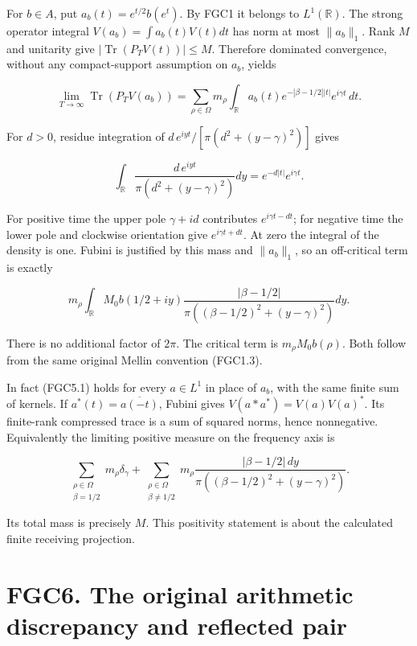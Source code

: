 For \(b\in A\), put \(a_b(t)=e^{t/2}b(e^t)\). By FGC1 it belongs to
\(L^1(\mathbb R)\). The strong operator integral
\(V(a_b)=\int a_b(t)V(t)dt\) has norm at most \(\|a_b\|_1\). Rank \(M\)
and unitarity give \(|\operatorname{Tr}(P_TV(t))|\leq M\). Therefore
dominated convergence, without any compact-support assumption on
\(a_b\), yields

\[
 \lim_{T\to\infty}\operatorname{Tr}(P_TV(a_b))
 =\sum_{\rho\in\Omega}m_\rho\int_{\mathbb R}
 a_b(t)e^{-|\beta-1/2||t|}e^{i\gamma t}\,dt.
\tag{FGC5.1}
\]

For \(d>0\), residue integration of
\(d\,e^{iyt}/[\pi(d^2+(y-\gamma)^2)]\) gives

\[
 \int_{\mathbb R}\frac{d\,e^{iyt}}{\pi(d^2+(y-\gamma)^2)}dy
 =e^{-d|t|}e^{i\gamma t}.
\tag{FGC5.2}
\]

For positive time the upper pole \(\gamma+id\) contributes
\(e^{i\gamma t-dt}\); for negative time the lower pole and clockwise
orientation give \(e^{i\gamma t+dt}\). At zero the integral of the
density is one. Fubini is justified by this mass and \(\|a_b\|_1\), so
an off-critical term is exactly

\[
 m_\rho\int_{\mathbb R}M_0b(1/2+iy)
 \frac{|\beta-1/2|}{\pi((\beta-1/2)^2+(y-\gamma)^2)}dy.
\tag{FGC5.3}
\]

There is no additional factor of \(2\pi\). The critical term is
\(m_\rho M_0b(\rho)\). Both follow from the same original Mellin
convention (FGC1.3).

In fact (FGC5.1) holds for every \(a\in L^1\) in place of \(a_b\), with
the same finite sum of kernels. If \(a^*(t)=\overline{a(-t)}\), Fubini
gives \(V(a*a^*)=V(a)V(a)^*\). Its finite-rank compressed trace is a sum
of squared norms, hence nonnegative. Equivalently the limiting positive
measure on the frequency axis is

\[
 \sum_{\substack{\rho\in\Omega\\\beta=1/2}}m_\rho\delta_\gamma
 +\sum_{\substack{\rho\in\Omega\\\beta\ne1/2}}
 m_\rho\frac{|\beta-1/2|\,dy}
 {\pi((\beta-1/2)^2+(y-\gamma)^2)}.
\tag{FGC5.4}
\]

Its total mass is precisely \(M\). This positivity statement is about
the calculated finite receiving projection.

\section{FGC6. The original arithmetic discrepancy and reflected
pair}\label{fgc6.-the-original-arithmetic-discrepancy-and-reflected-pair}

